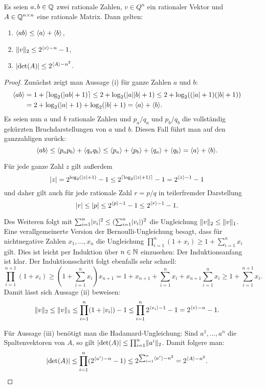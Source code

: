 \begin{proposition}\label{prop-rational-bounds-encoding}
	Es seien $a,b\in\mathbb{Q}$ zwei rationale Zahlen, $v\in Q^n$ ein rationaler Vektor und $A\in\mathbb{Q}^{n\times n}$ eine rationale Matrix.
	Dann gelten:
	\begin{enumerate}[label=(\roman*)]
		\item $\langle ab\rangle \leq \langle a\rangle+\langle b\rangle$,
		\item $\lVert v\rVert_2 \leq 2^{\langle v\rangle - n} - 1$,
		\item $\lvert\det(A)\rvert \leq 2^{\langle A\rangle - n^2}$.
	\end{enumerate}
\end{proposition}
\begin{proof}
	Zunächst zeigt man Aussage (i) für ganze Zahlen $a$ und $b$:
	\begin{align*}
		\langle ab\rangle &= 1+\lceil \log_2(\lvert ab\rvert + 1) \rceil \leq 2+\log_2(\lvert a\rvert\lvert b\rvert+1) \leq 2+\log_2((\lvert a\rvert+1)(\lvert b\rvert+1))\\
		&=2+\log_2(\lvert a\rvert + 1) + \log_2(\lvert b\rvert + 1) = \langle a\rangle + \langle b\rangle.
	\end{align*}
	Es seien nun $a$ und $b$ rationale Zahlen und $p_a/q_a$ und $p_b/q_b$ die vollständig gekürzten Bruchdarstellungen von $a$ und $b$.
	Diesen Fall führt man auf den ganzzahligen zurück: \[
	\langle ab\rangle \leq \langle p_a p_b\rangle + \langle q_a q_b\rangle \leq \langle p_a\rangle+\langle p_b\rangle + \langle q_a\rangle + \langle q_b\rangle = \langle a\rangle + \langle b\rangle.\]
	
	Für jede ganze Zahl $z$ gilt außerdem 
	\[
	\lvert z\rvert = 2^{\log_2(\lvert z\rvert + 1)} - 1 \leq 2^{\lceil\log_2(\lvert z\rvert + 1)\rceil} - 1 = 2^{\langle z\rangle - 1} - 1
	\]
	und daher gilt auch für jede rationale Zahl $r = p/q$ in teilerfremder Darstellung
	\[
	\lvert r\rvert \leq \lvert p\rvert \leq 2^{\langle p\rangle -1} - 1 \leq 2^{\langle r\rangle - 1} -1.
	\]
	
	Des Weiteren folgt mit $\sum_{i=1}^n \lvert v_i\rvert^2 \leq (\sum_{i=1}^n \lvert v_i\rvert)^2$ die Ungleichung $\lVert v\rVert_2 \leq \lVert v\rVert_1$.
	Eine verallgemeinerte Version der Bernoulli-Ungleichung besagt, dass für nichtnegative Zahlen $x_1,\dots,x_n$ die Ungleichung $\prod_{i=1}^n (1+x_i) \geq 1 + \sum_{i=1}^n x_i$ gilt.
	Dies ist leicht per Induktion über $n\in\mathbb{N}$ einzusehen:
	Der Induktionsanfang ist klar.
	Der Induktionsschritt folgt ebenfalls sehr schnell:
	\[
	\prod_{i=1}^{n+1} (1+x_i) \geq (1 + \sum_{i=1}^n x_i) x_{n+1} = 1 + x_{n+1} + \sum_{i=1}^n x_i + x_{n+1} \sum_{i=1}^n x_i \geq 1 + \sum_{i=1}^{n+1} x_i.
	\]
	Damit lässt sich Aussage (ii) beweisen:
	\[
		\lVert v\rVert_2 \leq \lVert v\rVert_1 \leq \prod_{i=1}^{n} (1+\lvert v_i\rvert) - 1 \leq \prod_{i=1}^n 2^{\langle v_i\rangle - 1} - 1 = 2^{\langle v\rangle - n} - 1.
	\] 
	
	Für Aussage (iii) benötigt man die Hadamard-Ungleichung: Sind $a^1, \dots, a^n$ die Spaltenvektoren von $A$, so gilt $\lvert\det(A)\rvert \leq \prod_{i=1}^{n} \lVert a^i\rVert_2$.
	Damit folgere man:
	\[
		\lvert\det(A)\rvert \leq \prod_{i=1}^n (2^{\langle a^i\rangle - n} - 1) \leq 2^{\sum_{i=1}^n \langle a^i\rangle - n^2} = 2^{\langle A\rangle - n^2}.
	\]
\end{proof}

